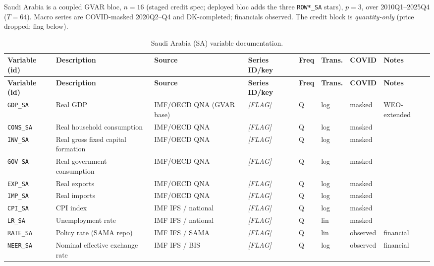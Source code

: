 Saudi Arabia is a coupled GVAR bloc, $n=16$ (staged credit spec; deployed bloc
adds the three \texttt{ROW*\_SA} stars), $p=3$, over 2010Q1--2025Q4 ($T=64$).
Macro series are COVID-masked 2020Q2--Q4 and DK-completed; financials observed.
The credit block is \emph{quantity-only} (price dropped; flag below).

{\footnotesize
\begin{longtable}{p{2.3cm}p{3.3cm}p{2.1cm}p{2.2cm}p{0.6cm}p{1.4cm}p{1.9cm}p{2.4cm}}
\caption{Saudi Arabia (SA) variable documentation.}\label{tab:data:SA}\\
\toprule
\textbf{Variable (id)} & \textbf{Description} & \textbf{Source} & \textbf{Series ID/key} & \textbf{Freq} & \textbf{Trans.} & \textbf{COVID} & \textbf{Notes} \\
\midrule
\endfirsthead
\toprule
\textbf{Variable (id)} & \textbf{Description} & \textbf{Source} & \textbf{Series ID/key} & \textbf{Freq} & \textbf{Trans.} & \textbf{COVID} & \textbf{Notes} \\
\midrule
\endhead
\bottomrule
\endfoot
\texttt{GDP\_SA}    & Real GDP                           & IMF/OECD QNA (GVAR base) & \textit{[FLAG]} & Q & log & masked & WEO-extended \\
\texttt{CONS\_SA}   & Real household consumption         & IMF/OECD QNA & \textit{[FLAG]} & Q & log & masked & \\
\texttt{INV\_SA}    & Real gross fixed capital formation & IMF/OECD QNA & \textit{[FLAG]} & Q & log & masked & \\
\texttt{GOV\_SA}    & Real government consumption        & IMF/OECD QNA & \textit{[FLAG]} & Q & log & masked & \\
\texttt{EXP\_SA}    & Real exports                       & IMF/OECD QNA & \textit{[FLAG]} & Q & log & masked & \\
\texttt{IMP\_SA}    & Real imports                       & IMF/OECD QNA & \textit{[FLAG]} & Q & log & masked & \\
\texttt{CPI\_SA}    & CPI index                          & IMF IFS / national & \textit{[FLAG]} & Q & log & masked & \\
\texttt{LR\_SA}     & Unemployment rate                  & IMF IFS / national & \textit{[FLAG]} & Q & lin & masked & \\
\texttt{RATE\_SA}   & Policy rate (SAMA repo)            & IMF IFS / SAMA & \textit{[FLAG]} & Q & lin & observed & financial \\
\texttt{NEER\_SA}   & Nominal effective exchange rate    & IMF IFS / BIS & \textit{[FLAG]} & Q & log & observed & financial \\

\end{longtable}}
